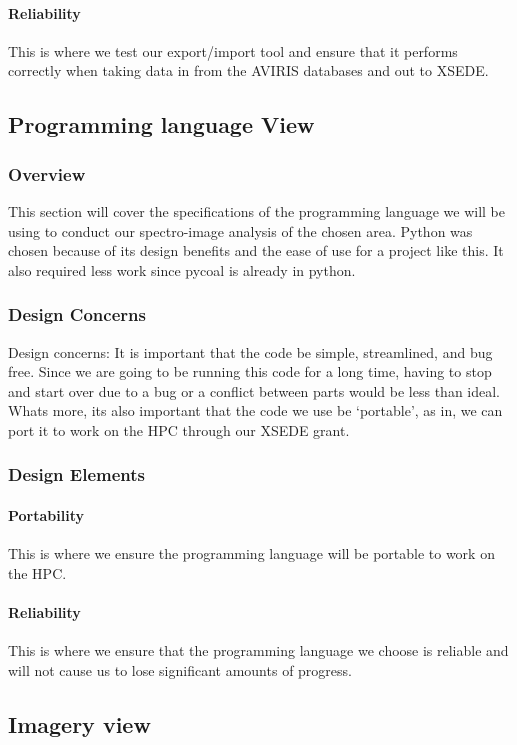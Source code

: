 \documentclass[10pt,draftclsnofoot,onecolumn,journal,compsoc]{IEEEtran}
\begin{document}
\paragraph{Reliability}
This is where we test our export/import tool and ensure that it performs correctly when taking data in from the AVIRIS databases and out to XSEDE.

\subsection{Programming language View}
\subsubsection{Overview}
This section will cover the specifications of the programming language we will be using to conduct our spectro-image analysis of the chosen area. Python was chosen because of its design benefits and the ease of use for a project like this. It also required less work since pycoal is already in python.
\subsubsection{Design Concerns}
Design concerns: It is important that the code be simple, streamlined, and bug free. Since we are going to be running this code for a long time, having to stop and start over due to a bug or a conflict between parts would be less than ideal. Whats more, its also important that the code we use be ‘portable’, as in, we can port it to work on the HPC through our XSEDE grant.
\subsubsection{Design Elements}
\paragraph{Portability}
This is where we ensure the programming language will be portable to work on the HPC.
\paragraph{Reliability}
This is where we ensure that the programming language we choose is reliable and will not cause us to lose significant amounts of progress.

\subsection{Imagery view}
\end{document}
